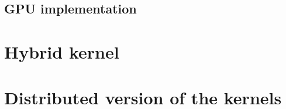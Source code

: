 \subsection{GPU implementation}

\section{Hybrid kernel}

\section{Distributed version of the kernels}
